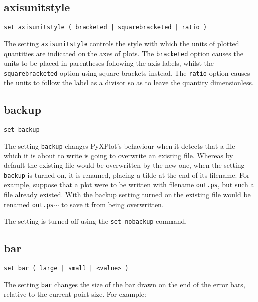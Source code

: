 \subsection{axisunitstyle}

\begin{verbatim}
set axisunitstyle ( bracketed | squarebracketed | ratio )
\end{verbatim}

The setting {\tt axisunitstyle} controls the style with which the units of
plotted quantities are indicated on the axes of plots. The {\tt bracketed}
option causes the units to be placed in parentheses following the axis labels,
whilst the {\tt square\-bracketed} option using square brackets instead.  The
{\tt ratio} option causes the units to follow the label as a divisor so as to
leave the quantity dimensionless.


\subsection{backup}

\begin{verbatim}
set backup
\end{verbatim}

The setting {\tt backup} changes PyXPlot's behaviour when it detects that a
file which it is about to write is going to overwrite an existing file. Whereas
by default the existing file would be overwritten by the new one, when the
setting {\tt backup} is turned on, it is renamed, placing a tilde at the end of
its filename. For example, suppose that a plot were to be written with filename
{\tt out.ps}, but such a file already existed.  With the backup setting turned
on the existing file would be renamed {\tt out.ps$\sim$} to save it from being
overwritten.

The setting is turned off using the {\tt set nobackup} command.


\subsection{bar}

\begin{verbatim}
set bar ( large | small | <value> )
\end{verbatim}

The setting {\tt bar} changes the size of the bar drawn on the end of the error
bars, relative to the current point size.  For example:

